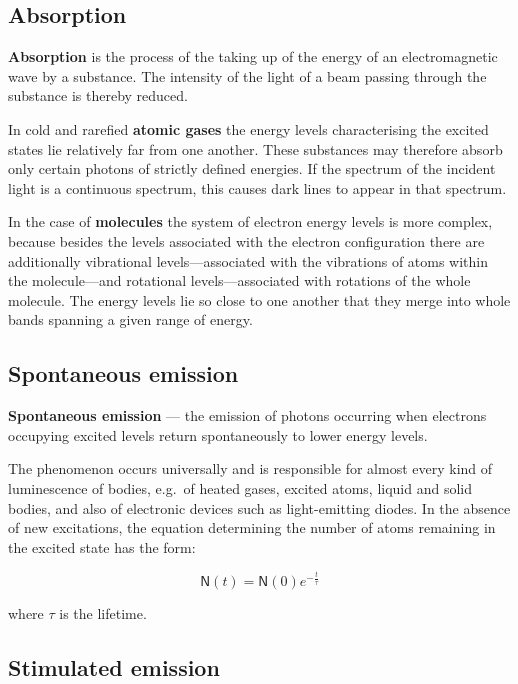 \subsection{Absorption}

\textbf{Absorption} is the process of the taking up of the energy of an electromagnetic wave by a substance. The intensity of the light of a beam passing through the substance is thereby reduced.

In cold and rarefied \textbf{atomic gases} the energy levels characterising the excited states lie relatively far from one another. These substances may therefore absorb only certain photons of strictly defined energies. If the spectrum of the incident light is a continuous spectrum, this causes dark lines to appear in that spectrum.

In the case of \textbf{molecules} the system of electron energy levels is more complex, because besides the levels associated with the electron configuration there are additionally vibrational levels---associated with the vibrations of atoms within the molecule---and rotational levels---associated with rotations of the whole molecule. The energy levels lie so close to one another that they merge into whole bands spanning a given range of energy.

\subsection{Spontaneous emission}

\textbf{Spontaneous emission} --- the emission of photons occurring when electrons occupying excited levels return spontaneously to lower energy levels.

The phenomenon occurs universally and is responsible for almost every kind of luminescence of bodies, e.g.\ of heated gases, excited atoms, liquid and solid bodies, and also of electronic devices such as light-emitting diodes. In the absence of new excitations, the equation determining the number of atoms remaining in the excited state has the form:

\begin{equation}
    \mathsf{N}\left(t\right) = \mathsf{N}\left(0\right)e^{-\frac{t}{\tau}}
\end{equation}

where $\tau$ is the lifetime.

\subsection{Stimulated emission}

